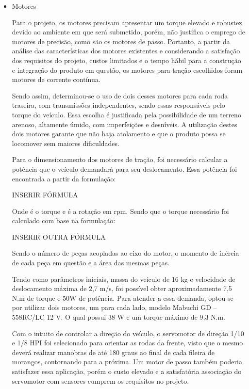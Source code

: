   \begin{itemize}
    \item Motores


    Para o projeto, os motores precisam apresentar um torque elevado e robustez
    devido ao ambiente em que será submetido, porém, não justifica o emprego de
    motores de precisão, como são os motores de passo. Portanto, a partir da
    análise das características dos motores existentes e considerando a satisfação
    dos requisitos do projeto, custos limitados e o tempo hábil para a construção
    e integração do produto em questão, os motores para tração escolhidos foram
    motores de corrente contínua.

    Sendo assim, determinou-se o uso de dois desses motores para cada roda
    traseira, com transmissões independentes, sendo essas responsáveis pelo torque
    do veículo. Essa escolha é justificada pela possibilidade de um terreno
    arenoso, altamente úmido, com imperfeições e desníveis. A utilização destes
    dois motores garante que não haja atolamento e que o produto possa se locomover sem
    maiores dificuldades.

    Para o dimensionamento dos motores de tração, foi necessário calcular a
    potência que o veículo demandará para seu deslocamento. Essa potência foi
    encontrada a partir da formulação:

      INSERIR FÓRMULA

    Onde  é o torque e  é a rotação em rpm. Sendo que o torque necessário foi calculado com base na formulação:

      INSERIR  OUTRA FÓRMULA

    Sendo  o número de peças acopladas ao eixo do motor,  o momento de inércia de cada peça em questão e  a área das mesmas peças.

    Tendo como parâmetros iniciais, massa do veículo de 16 kg e velocidade de deslocamento máxima de 2,7 m/s, foi possível obter aproximadamente 7,5 N.m de torque e 50W de potência. Para atender a essa demanda, optou-se por utilizar dois motores, um para cada lado, modelo Mabuchi GD – 558RC/LC 12 V. O qual possui 38 W e um torque máximo de 9,3 N.m.

Com o intuito de controlar a direção do veículo, o servomotor de direção 1/10 e 1/8 HPI foi selecionado para orientar as rodas da frente, visto que o mesmo deverá realizar manobras de até 180 graus ao final de cada fileira de morangos, contornando para a próxima. Um motor de passo também poderia satisfazer essa aplicação, porém o custo elevado e a satisfatória associação do servomotor com sensores cumprem os requisitos no projeto.


\end{itemize}
